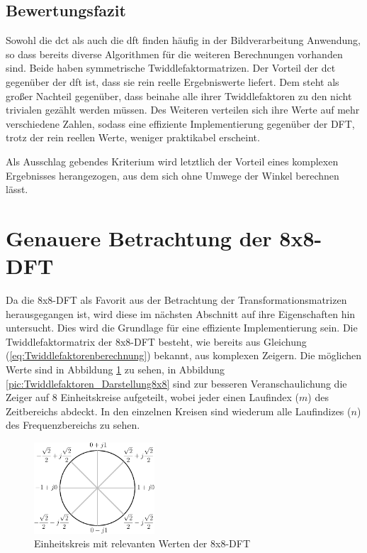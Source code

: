  
 \subsection{Bewertungsfazit}
 Sowohl die \gls{dct} als auch die \gls{dft} finden häufig in der Bildverarbeitung Anwendung, so dass bereits diverse Algorithmen für die weiteren
 Berechnungen vorhanden sind. Beide haben symmetrische Twiddlefaktormatrizen.
 Der Vorteil der \gls{dct} gegenüber der \gls{dft} ist, dass sie rein reelle Ergebniswerte liefert. 
 Dem steht als großer Nachteil gegenüber, dass beinahe alle ihrer Twiddlefaktoren zu den nicht trivialen gezählt werden müssen. 
 Des Weiteren verteilen sich ihre Werte auf mehr verschiedene Zahlen, sodass eine effiziente Implementierung gegenüber der DFT, trotz der rein reellen
 Werte, weniger praktikabel erscheint.
 
 Als Ausschlag gebendes Kriterium wird letztlich der Vorteil eines komplexen Ergebnisses herangezogen, aus dem sich ohne Umwege der Winkel berechnen lässt.

 

 
 
 \section{Genauere Betrachtung der 8x8-DFT}\label{sec:AnalyseGenauereBetrachtung8x8}
 Da die 8x8-DFT als Favorit aus der Betrachtung der Transformationsmatrizen herausgegangen ist, wird diese im nächsten Abschnitt auf ihre Eigenschaften
 hin untersucht. Dies wird die Grundlage für eine effiziente Implementierung sein. 
 Die Twiddlefaktormatrix der 8x8-DFT besteht, wie bereits aus Gleichung (\ref{eq:Twiddlefaktorenberechnung}) bekannt, aus komplexen Zeigern.
 Die möglichen Werte sind in Abbildung \ref{pic:Einheitskreis_Faktoren} zu sehen, 
 in Abbildung \ref{pic:Twiddlefaktoren_Darstellung8x8} sind zur besseren Veranschaulichung die Zeiger auf 8 Einheitskreise aufgeteilt,
 wobei jeder einen Laufindex ($m$) des Zeitbereichs abdeckt. In den einzelnen Kreisen sind wiederum alle Laufindizes ($n$) des Frequenzbereichs zu sehen.
 
  \begin{figure}[!h]
  \centering
  \includegraphics[width=0.4\textwidth]{img/Einheitskreis-crop.pdf}
  \caption{Einheitskreis mit relevanten Werten der 8x8-DFT}
  \label{pic:Einheitskreis_Faktoren}
\end{figure}
  
